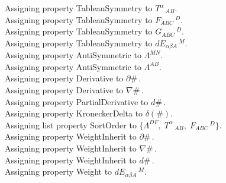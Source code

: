 \documentclass[11pt]{article}
\begin{document}
Assigning property TableauSymmetry to ${T}^{\alpha}\,_{A B}$.
\\
Assigning property TableauSymmetry to ${F}_{A B C}\,^{D}$.
\\
Assigning property TableauSymmetry to ${G}_{A B C}\,^{D}$.
\\
Assigning property TableauSymmetry to ${dE}_{\alpha \beta A}\,^{M}$.
\\
Assigning property AntiSymmetric to ${\Lambda}^{M N}$.
\\
Assigning property AntiSymmetric to ${\Lambda}^{A B}$.
\\
Assigning property Derivative to $\partial{\#}\, $.
\\
Assigning property Derivative to $\nabla{\#}\, $.
\\
Assigning property PartialDerivative to $d{\#}\, $.
\\
Assigning property KroneckerDelta to $\delta(\#)$.
\\
Assigning list property SortOrder to $\{{\Lambda}^{D F},\; {T}^{\alpha}\,_{A B},\; {F}_{A B C}\,^{D}\}$.
\\
Assigning property WeightInherit to $\partial{\#}\, $.
\\
Assigning property WeightInherit to $\nabla{\#}\, $.
\\
Assigning property WeightInherit to $d{\#}\, $.
\\
Assigning property Weight to ${dE}_{\alpha \beta A}\,^{M}$.
\\
\end{document}
